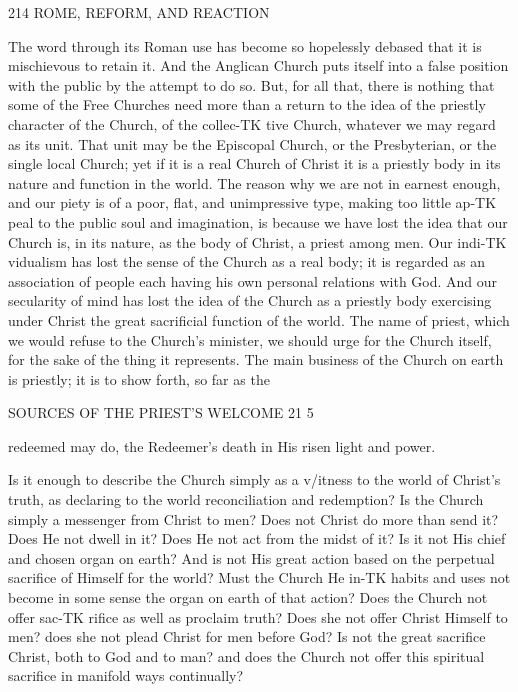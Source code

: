 \documentclass[12pt,a5paper,oneside]{book}
\begin{document}
{{214 ROME, REFORM, AND REACTION 

The word through its Roman use has become so 
hopelessly debased that it is mischievous to retain it. 
And the Anglican Church puts itself into a false 
position with the public by the attempt to do so. 
But, for all that, there is nothing that some of the 
Free Churches need more than a return to the idea 
of the priestly character of the Church, of the collec-TK
tive Church, whatever we may regard as its unit. 
That unit may be the Episcopal Church, or the 
Presbyterian, or the single local Church; yet if it is 
a real Church of Christ it is a priestly body in its 
nature and function in the world. The reason why 
we are not in earnest enough, and our piety is of a 
poor, flat, and unimpressive type, making too little ap-TK
peal to the public soul and imagination, is because we 
have lost the idea that our Church is, in its nature, as 
the body of Christ, a priest among men. Our indi-TK
vidualism has lost the sense of the Church as a real 
body; it is regarded as an association of people each 
having his own personal relations with God. And 
our secularity of mind has lost the idea of the Church 
as a priestly body exercising under Christ the great 
sacrificial function of the world. The name of priest, 
which we would refuse to the Church's minister, we 
should urge for the Church itself, for the sake of the 
thing it represents. The main business of the Church 
on earth is priestly; it is to show forth, so far as the 



SOURCES OF THE PRIEST'S WELCOME 21 5 

redeemed may do, the Redeemer's death in His risen 
light and power. 

Is it enough to describe the Church simply as a 
v/itness to the world of Christ's truth, as declaring to 
the world reconciliation and redemption? Is the 
Church simply a messenger from Christ to men? 
Does not Christ do more than send it? Does He not 
dwell in it? Does He not act from the midst of it? 
Is it not His chief and chosen organ on earth? And 
is not His great action based on the perpetual sacrifice 
of Himself for the world? Must the Church He in-TK
habits and uses not become in some sense the organ on 
earth of that action? Does the Church not offer sac-TK
rifice as well as proclaim truth? Does she not offer 
Christ Himself to men? does she not plead Christ for 
men before God? Is not the great sacrifice Christ, both 
to God and to man? and does the Church not offer 
this spiritual sacrifice in manifold ways continually? 

}}
\end{document}
